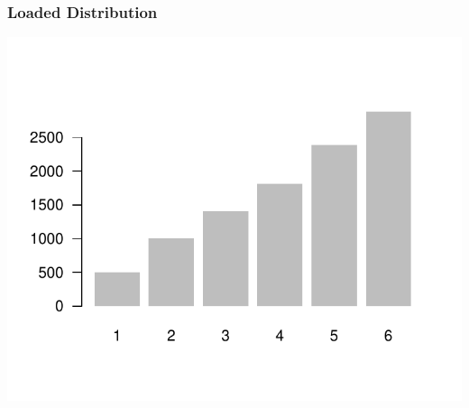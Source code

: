 \documentclass[12pt]{beamer}\usepackage[]{graphicx}\usepackage[]{color}
\newenvironment{knitrout}{}{} %
\begin{document}
\begin{frame}[fragile]
\frametitle{Loaded Distribution}

\begin{knitrout}\footnotesize
{}\color{fgcolor}

{\centering \includegraphics[width=.7\linewidth,height=.6\linewidth]{figure/unnamed-chunk-35-1} 

}



\end{knitrout}

\end{frame}


\begin{frame}
\begin{center}
\Huge{}
\end{center}
\end{frame}


\begin{frame}[fragile]
\frametitle{}
\begin{center}
\end{center}
\end{frame}

\end{document}
